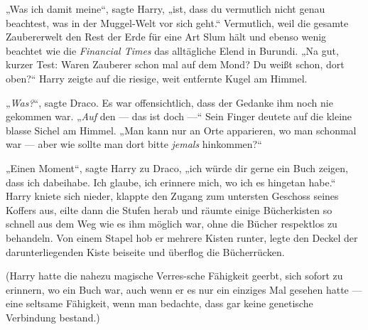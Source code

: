 „Was ich damit meine“, sagte Harry, „ist, dass du vermutlich nicht genau beachtest, was in der Muggel-Welt vor sich geht.“ Vermutlich, weil die gesamte Zaubererwelt den Rest der Erde für eine Art Slum hält und ebenso wenig beachtet wie die \emph{Financial Times} das alltägliche Elend in Burundi.
„Na gut, kurzer Test: Waren Zauberer schon mal auf dem Mond? Du weißt schon, dort oben?“ Harry zeigte auf die riesige, weit entfernte Kugel am Himmel.

„\emph{Was?}“, sagte Draco. Es war offensichtlich, dass der Gedanke ihm noch nie gekommen war.
„\emph{Auf} den — das ist doch —“ Sein Finger deutete auf die kleine blasse Sichel am Himmel.
„Man kann nur an Orte apparieren, wo man schonmal war — aber wie sollte man dort bitte \emph{jemals} hinkommen?“

„Einen Moment“, sagte Harry zu Draco, „ich würde dir gerne ein Buch zeigen, dass ich dabeihabe. Ich glaube, ich erinnere mich, wo ich es hingetan habe.“ Harry kniete sich nieder, klappte den Zugang zum untersten Geschoss seines Koffers aus, eilte dann die Stufen herab und räumte einige Bücherkisten so schnell aus dem Weg wie es ihm möglich war, ohne die Bücher respektlos zu behandeln. Von einem Stapel hob er mehrere Kisten runter, legte den Deckel der darunterliegenden Kiste beiseite und überflog die Bücherrücken.

(Harry hatte die nahezu magische Verres-sche Fähigkeit geerbt, sich sofort zu erinnern, wo ein Buch war, auch wenn er es nur ein einziges Mal gesehen hatte — eine seltsame Fähigkeit, wenn man bedachte, dass gar keine genetische Verbindung bestand.)

